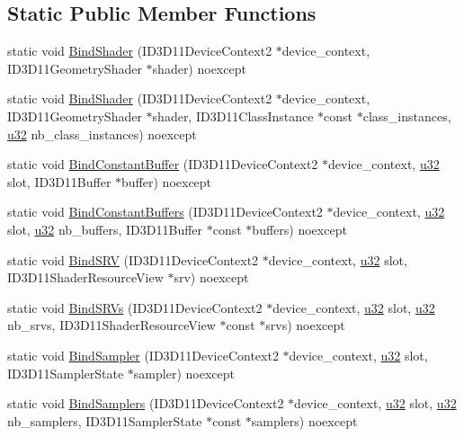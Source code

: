 \subsection*{Static Public Member Functions}
\begin{DoxyCompactItemize}
\item 
static void \hyperlink{structmage_1_1_pipeline_1_1_g_s_a52ce54ebdc1ebf2991921c8cfbe8cec2}{Bind\+Shader} (I\+D3\+D11\+Device\+Context2 $\ast$device\+\_\+context, I\+D3\+D11\+Geometry\+Shader $\ast$shader) noexcept
\item 
static void \hyperlink{structmage_1_1_pipeline_1_1_g_s_aac7863639d9d631d4b4cda0829a6232e}{Bind\+Shader} (I\+D3\+D11\+Device\+Context2 $\ast$device\+\_\+context, I\+D3\+D11\+Geometry\+Shader $\ast$shader, I\+D3\+D11\+Class\+Instance $\ast$const $\ast$class\+\_\+instances, \hyperlink{namespacemage_af2b398bf98eb10351f49cad73fe2cc73}{u32} nb\+\_\+class\+\_\+instances) noexcept
\item 
static void \hyperlink{structmage_1_1_pipeline_1_1_g_s_a3b209aae1aeb5ec125db85f49a314195}{Bind\+Constant\+Buffer} (I\+D3\+D11\+Device\+Context2 $\ast$device\+\_\+context, \hyperlink{namespacemage_af2b398bf98eb10351f49cad73fe2cc73}{u32} slot, I\+D3\+D11\+Buffer $\ast$buffer) noexcept
\item 
static void \hyperlink{structmage_1_1_pipeline_1_1_g_s_a497e31e6d0be392b6db5f02996f21475}{Bind\+Constant\+Buffers} (I\+D3\+D11\+Device\+Context2 $\ast$device\+\_\+context, \hyperlink{namespacemage_af2b398bf98eb10351f49cad73fe2cc73}{u32} slot, \hyperlink{namespacemage_af2b398bf98eb10351f49cad73fe2cc73}{u32} nb\+\_\+buffers, I\+D3\+D11\+Buffer $\ast$const $\ast$buffers) noexcept
\item 
static void \hyperlink{structmage_1_1_pipeline_1_1_g_s_ad17a63f15228ccea6ba1cc77cbed6d7e}{Bind\+S\+RV} (I\+D3\+D11\+Device\+Context2 $\ast$device\+\_\+context, \hyperlink{namespacemage_af2b398bf98eb10351f49cad73fe2cc73}{u32} slot, I\+D3\+D11\+Shader\+Resource\+View $\ast$srv) noexcept
\item 
static void \hyperlink{structmage_1_1_pipeline_1_1_g_s_a0519b6fad4f992f0bcc2d83500bec6b0}{Bind\+S\+R\+Vs} (I\+D3\+D11\+Device\+Context2 $\ast$device\+\_\+context, \hyperlink{namespacemage_af2b398bf98eb10351f49cad73fe2cc73}{u32} slot, \hyperlink{namespacemage_af2b398bf98eb10351f49cad73fe2cc73}{u32} nb\+\_\+srvs, I\+D3\+D11\+Shader\+Resource\+View $\ast$const $\ast$srvs) noexcept
\item 
static void \hyperlink{structmage_1_1_pipeline_1_1_g_s_a2e5137213e78dfca4f6b42d65f3e2302}{Bind\+Sampler} (I\+D3\+D11\+Device\+Context2 $\ast$device\+\_\+context, \hyperlink{namespacemage_af2b398bf98eb10351f49cad73fe2cc73}{u32} slot, I\+D3\+D11\+Sampler\+State $\ast$sampler) noexcept
\item 
static void \hyperlink{structmage_1_1_pipeline_1_1_g_s_afc61d663808e4a8a561e8d60addc29a4}{Bind\+Samplers} (I\+D3\+D11\+Device\+Context2 $\ast$device\+\_\+context, \hyperlink{namespacemage_af2b398bf98eb10351f49cad73fe2cc73}{u32} slot, \hyperlink{namespacemage_af2b398bf98eb10351f49cad73fe2cc73}{u32} nb\+\_\+samplers, I\+D3\+D11\+Sampler\+State $\ast$const $\ast$samplers) noexcept
\end{DoxyCompactItemize}
